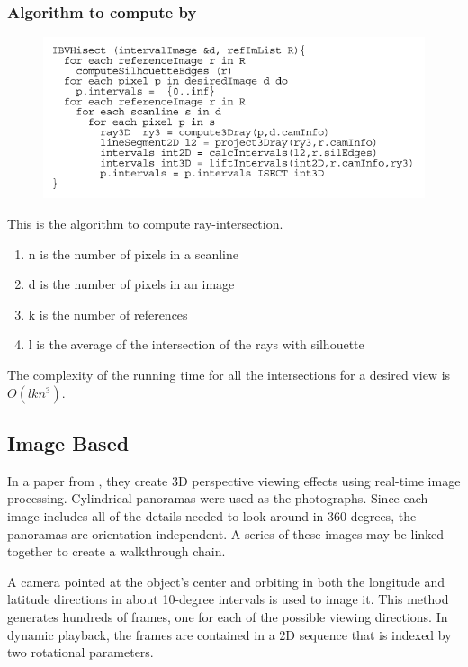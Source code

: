 \documentclass[a4paper]{report}
\begin{document}
\subsubsection{Algorithm to compute by }
\begin{figure}[h]
\includegraphics[scale=0.7]{intersection.jpg} 
\end{figure}
This is the algorithm to compute ray-intersection.
\begin{enumerate}
\item n is the number of pixels in a scanline
\item d is the number of pixels in an image
\item k is the number of references
\item l is the average of the intersection of the rays with silhouette
\end{enumerate}
The complexity of the running time for all the intersections for a desired view is \(O(lkn^3)\).
\subsection{Image Based}
In a paper from \cite{Chen:95},  they create 3D perspective viewing effects using real-time image processing. Cylindrical panoramas were used as the photographs. Since each image includes all of the details needed to look around in 360 degrees, the panoramas are orientation independent. A series of these images may be linked together to create a walkthrough chain.

A camera pointed at the object's center and orbiting in both the longitude and latitude directions in about 10-degree intervals is used to image it. This method generates hundreds of frames, one for each of the possible viewing directions. In dynamic playback, the frames are contained in a 2D sequence that is indexed by two rotational parameters.
\newpage
\end{document}
